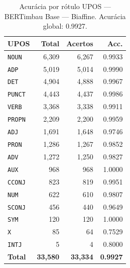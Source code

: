 \begin{table}[ht]
\centering
\footnotesize
\begin{tabular}{lrrr}
\toprule
\textbf{UPOS} & \textbf{Total} & \textbf{Acertos} & \textbf{Acc.} \\
\midrule
\texttt{NOUN} & 6,309 & 6,267 & 0.9933 \\
\texttt{ADP} & 5,019 & 5,014 & 0.9990 \\
\texttt{DET} & 4,904 & 4,888 & 0.9967 \\
\texttt{PUNCT} & 4,443 & 4,437 & 0.9986 \\
\texttt{VERB} & 3,368 & 3,338 & 0.9911 \\
\texttt{PROPN} & 2,209 & 2,200 & 0.9959 \\
\texttt{ADJ} & 1,691 & 1,648 & 0.9746 \\
\texttt{PRON} & 1,286 & 1,267 & 0.9852 \\
\texttt{ADV} & 1,272 & 1,250 & 0.9827 \\
\texttt{AUX} & 968 & 968 & 1.0000 \\
\texttt{CCONJ} & 823 & 819 & 0.9951 \\
\texttt{NUM} & 622 & 610 & 0.9807 \\
\texttt{SCONJ} & 456 & 440 & 0.9649 \\
\texttt{SYM} & 120 & 120 & 1.0000 \\
\texttt{X} & 85 & 64 & 0.7529 \\
\texttt{INTJ} & 5 & 4 & 0.8000 \\
\midrule
\textbf{Total} & \textbf{33,580} & \textbf{33,334} & \textbf{0.9927} \\
\bottomrule
\end{tabular}
\caption{Acurácia por rótulo UPOS — BERTimbau Base — Biaffine. Acurácia global: 0.9927.}
\label{tab:upos-acc-predict-test-df-bertimbau-base-biaffine}
\end{table}


